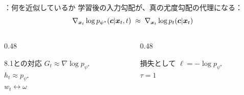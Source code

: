 \begin{frame}{\supplmark：何を近似しているか}
    学習後の入力勾配が、真の尤度勾配の代理になる：
    \[
        \nabla_{\bm{x}_t}\log p_{\psi^\star}(\bm{c}|\bm{x}_t,t)
        \;\approx\;
        \nabla_{\bm{x}_t}\log p_t(\bm{c}|\bm{x}_t)
    \]
    \begin{columns}[T,onlytextwidth]
        \begin{column}{0.48\textwidth}
            \begin{exampleblock}{8.1との対応}
                $G_t\approx\nabla\log p_{\psi^\star}$\\
                $h_t\approx p_{\psi^\star}$\\
                $w_t\leftrightarrow\omega$
            \end{exampleblock}
        \end{column}
        \begin{column}{0.48\textwidth}
            \begin{exampleblock}{損失として}
                $\ell=-\log p_{\psi^\star}$\\
                $\tau=1$
            \end{exampleblock}
        \end{column}
    \end{columns}
\end{frame}
